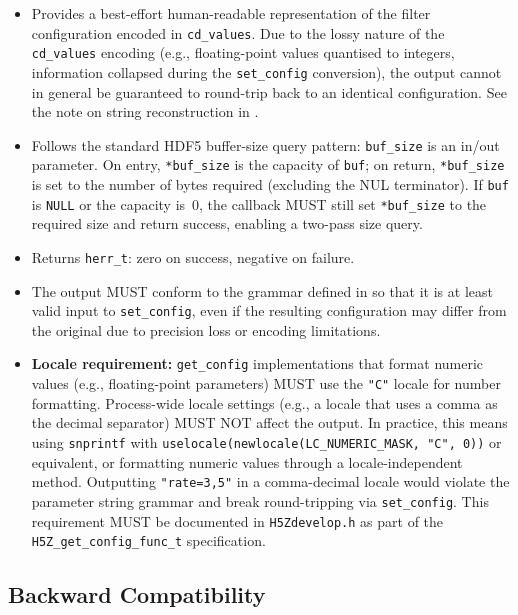 \documentclass[../HDF5_RFC.tex]{subfiles}
\begin{document}
\begin{itemize}
\item Provides a best-effort human-readable representation of the filter
  configuration encoded in \texttt{cd\_values}.  Due to the lossy nature of the
  \texttt{cd\_values} encoding (e.g., floating-point values quantised to integers,
  information collapsed during the \texttt{set\_config} conversion), the output
  cannot in general be guaranteed to round-trip back to an identical
  configuration.  See the note on string reconstruction in
  .
\item Follows the standard HDF5 buffer-size query pattern: \texttt{buf\_size} is
  an in/out parameter. On entry, \texttt{*buf\_size} is the capacity of \texttt{buf};
  on return, \texttt{*buf\_size} is set to the number of bytes required (excluding
  the NUL terminator). If \texttt{buf} is \texttt{NULL} or the capacity is~0, the
  callback MUST still set \texttt{*buf\_size} to the required size and return
  success, enabling a two-pass size query.
\item Returns \texttt{herr\_t}: zero on success, negative on failure.
\item The output MUST conform to the grammar defined in
   so that it is at least valid input to
  \texttt{set\_config}, even if the resulting configuration may differ from the
  original due to precision loss or encoding limitations.
\item \textbf{Locale requirement:} \texttt{get\_config} implementations that format
  numeric values (e.g., floating-point parameters) MUST use the \texttt{"C"} locale
  for number formatting. Process-wide locale settings (e.g., a locale that
  uses a comma as the decimal separator) MUST NOT affect the output. In
  practice, this means using \texttt{snprintf} with \texttt{uselocale(newlocale(LC\_NUMERIC\_MASK,
  "C", 0))} or equivalent, or formatting numeric values through a
  locale-independent method. Outputting \texttt{"rate=3,5"} in a
  comma-decimal locale would violate the parameter string grammar and break
  round-tripping via \texttt{set\_config}. This requirement MUST be documented
  in \texttt{H5Zdevelop.h} as part of the \texttt{H5Z\_get\_config\_func\_t} specification.
\end{itemize}


\subsection{Backward Compatibility}
\end{document}
